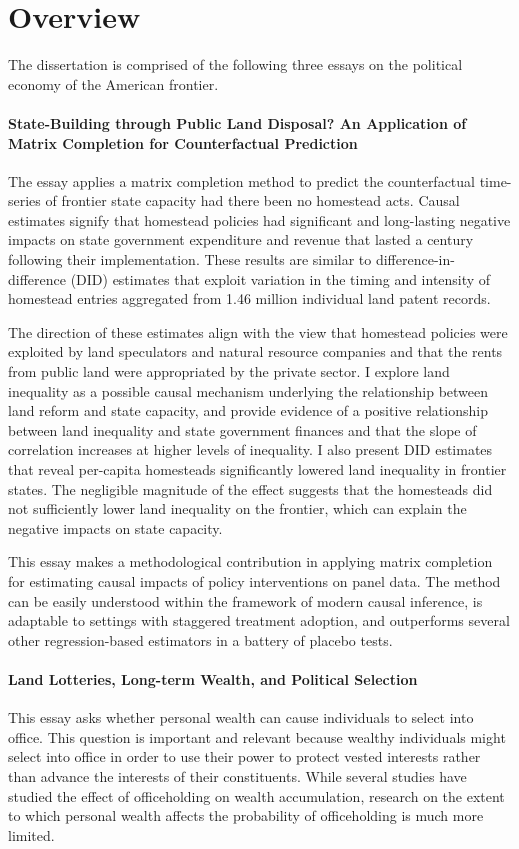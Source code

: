 \section{Overview}

The dissertation is comprised of the following three essays on the political economy of the American frontier. 

\paragraph{State-Building through Public Land Disposal? An Application of Matrix Completion for Counterfactual Prediction}
The essay applies a matrix completion method to predict the counterfactual time-series of frontier state capacity had there been no homestead acts. Causal estimates signify that homestead policies had significant and long-lasting negative impacts on state government expenditure and revenue that lasted a century following their implementation. These results are similar to difference-in-difference (DID) estimates that exploit variation in the timing and intensity of homestead entries aggregated from 1.46 million individual land patent records.

The direction of these estimates align with the view that homestead policies were exploited by land speculators and natural resource companies and that the rents from public land were appropriated by the private sector. I explore land inequality as a possible causal mechanism underlying the relationship between land reform and state capacity, and provide evidence of a positive relationship between land inequality and state government finances and that the slope of correlation increases at higher levels of inequality. I also present DID estimates that reveal per-capita homesteads significantly lowered land inequality in frontier states. The negligible magnitude of the effect suggests that the homesteads did not sufficiently lower land inequality on the frontier, which can explain the negative impacts on state capacity. 

This essay makes a methodological contribution in applying matrix completion for estimating causal impacts of policy interventions on panel data. The method can be easily understood within the framework of modern causal inference, is adaptable to settings with staggered treatment adoption, and outperforms several other regression-based estimators in a battery of placebo tests.

\paragraph{Land Lotteries, Long-term Wealth, and Political Selection} 
This essay asks whether personal wealth can cause individuals to select into office. This question is important and relevant because wealthy individuals might select into office in order to use their power to protect vested interests rather than advance the interests of their constituents. While several studies have studied the effect of officeholding on wealth accumulation, research on the extent to which personal wealth affects the probability of officeholding is much more limited.


